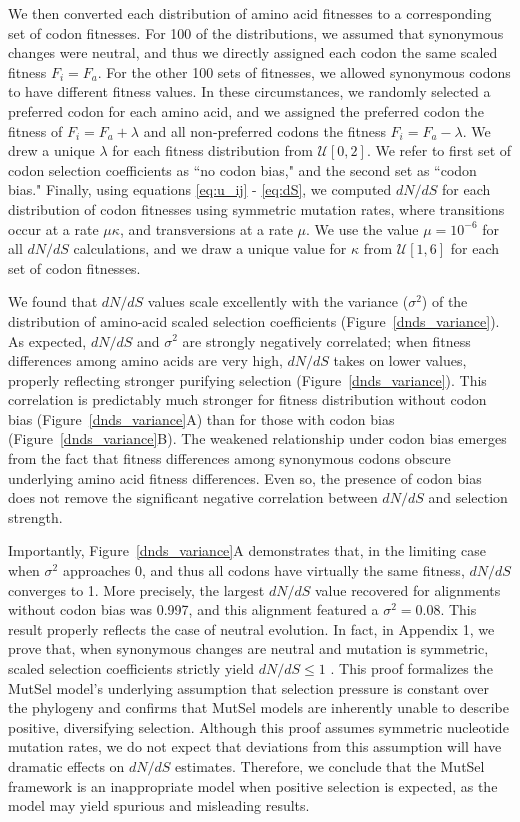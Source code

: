 \documentclass[11pt]{article}
\begin{document}
We then converted each distribution of amino acid fitnesses to a corresponding set of codon fitnesses. For 100 of the distributions, we assumed that synonymous changes were neutral, and thus we directly assigned each codon the same scaled fitness $F_i = F_a$. For the other 100 sets of fitnesses, we allowed synonymous codons to have different fitness values. In these circumstances, we randomly selected a preferred codon for each amino acid, and we assigned the preferred codon the fitness of $F_i = F_a + \lambda$ and all non-preferred codons the fitness $F_i = F_a - \lambda$. We drew a unique $\lambda$ for each fitness distribution from $\mathcal{U}[0,2]$. We refer to first set of codon selection coefficients as ``no codon bias," and the second set as ``codon bias." Finally, using equations \eqref{eq:u_ij} - \eqref{eq:dS}, we computed $dN/dS$ for each distribution of codon fitnesses using symmetric mutation rates, where transitions occur at a rate $\mu\kappa$, and transversions at a rate $\mu$. We use the value $\mu = 10^{-6}$ for all $dN/dS$ calculations, and we draw a unique value for $\kappa$ from $\mathcal{U}[1,6]$ for each set of codon fitnesses.

We found that $dN/dS$ values scale excellently with the variance ($\sigma^2$) of the distribution of amino-acid scaled selection coefficients (Figure~\ref{dnds_variance}). As expected, $dN/dS$ and $\sigma^2$ are strongly negatively correlated; when fitness differences among amino acids are very high, $dN/dS$ takes on lower values, properly reflecting stronger purifying selection (Figure~\ref{dnds_variance}). This correlation is predictably much stronger for fitness distribution without codon bias (Figure~\ref{dnds_variance}A) than for those with codon bias (Figure~\ref{dnds_variance}B). The weakened relationship under codon bias emerges from the fact that fitness differences among synonymous codons obscure underlying amino acid fitness differences. Even so, the presence of codon bias does not remove the significant negative correlation between $dN/dS$ and selection strength.
		
Importantly, Figure~\ref{dnds_variance}A demonstrates that, in the limiting case when $\sigma^2$ approaches 0, and thus all codons have virtually the same fitness, $dN/dS$ converges to 1. More precisely, the largest $dN/dS$ value recovered for alignments without codon bias was 0.997, and this alignment featured a $\sigma^2 = 0.08$. This result properly reflects the case of neutral evolution. In fact, in Appendix 1, we prove that, when synonymous changes are neutral and mutation is symmetric, scaled selection coefficients strictly yield $dN/dS \leq 1$ . This proof formalizes the MutSel model's underlying assumption that selection pressure is constant over the phylogeny and confirms that MutSel models are inherently unable to describe positive, diversifying selection. Although this proof assumes symmetric nucleotide mutation rates, we do not expect that deviations from this assumption will have dramatic effects on $dN/dS$ estimates. Therefore, we conclude that the MutSel framework is an inappropriate model when positive selection is expected, as the model may yield spurious and misleading results. 
\end{document}
